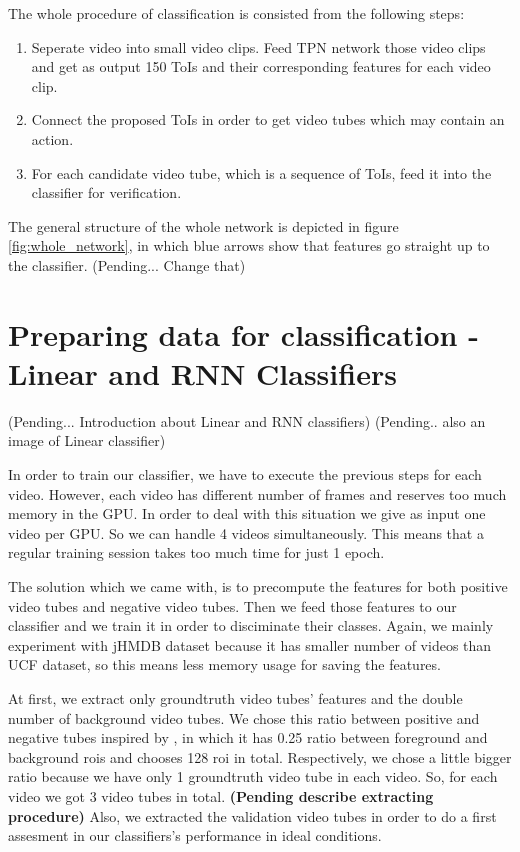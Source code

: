 \documentclass{report}
\begin{document}
The whole procedure of classification is consisted from the following steps:
\begin{enumerate}
\item Seperate video into small video clips. Feed TPN network those video clips and get as output
  150 ToIs and their corresponding features for each video clip.
\item Connect the proposed ToIs in order to get video tubes which may contain an action.
\item For each candidate video tube, which is a sequence of ToIs, feed it into the classifier
  for verification.
\end{enumerate}

The general structure of the whole network is depicted in figure \ref{fig:whole_network}, in which blue arrows show that
features go straight up to the classifier. (Pending... Change that)


\section{Preparing data for classification - Linear and RNN Classifiers}

(Pending... Introduction about Linear and RNN classifiers)
(Pending.. also an image of Linear classifier)

  

In order to train our classifier, we have to execute the previous steps for each video. However, each video
has different number of frames and reserves too much memory in the GPU. In order to deal with this situation
we give as input one video per GPU. So we can handle 4 videos simultaneously. This means that a regular
training session takes too much time for just 1 epoch. \par
The solution which we came with, is to precompute the features for both positive video tubes and negative video tubes.
Then we feed those features to our classifier and we train it in order to disciminate their classes.
Again, we mainly experiment with jHMDB dataset because it has smaller number of videos than UCF dataset, so this means
less memory usage for saving the features.\par
At first, we extract only groundtruth video tubes' features and the double number of background video tubes. We chose this
ratio between positive and negative tubes inspired by \cite{jjfaster2rcnn}, in which it has 0.25 ratio between foreground
and background rois and chooses 128 roi in total. Respectively, we chose a little bigger ratio because we have only 1 groundtruth
video tube in each video. So, for each video we got 3 video tubes in total.
\textbf{(Pending describe extracting procedure)}
Also, we extracted the validation video tubes in order to do a first assesment in our classifiers's performance in ideal conditions. 
\end{document}
